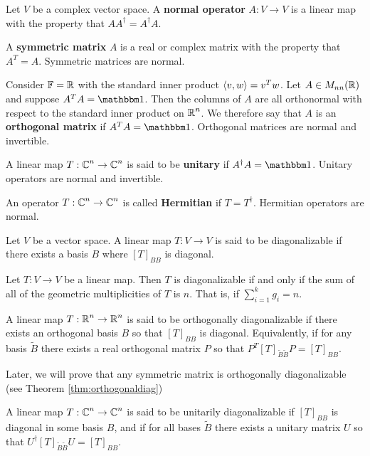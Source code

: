 \begin{defn} Let $V$ be a complex vector space. A \textbf{normal operator} $A: V\to V$ is a linear map with the property that $AA^\dagger = A^\dagger A$.
\end{defn}
\begin{defn} A \textbf{symmetric matrix} $A$ is a real or complex matrix with the property that $A^T = A$. Symmetric matrices are normal.
\end{defn}
\begin{example}
Consider $\operatorname{\mathbb{F}} = \operatorname{\mathbb{R}}$ with the standard inner product $\langle v,w\rangle = v^T w$. 
Let $A\in M_{nn}(\operatorname{\mathbb{R}})$ and suppose $A^T A = \One$. Then the columns of $A$ are all orthonormal with respect to the standard inner product on $\operatorname{\mathbb{R}}^n$. We therefore say that $A$ is an \textbf{orthogonal matrix} if $A^T A = \One$. Orthogonal matrices are normal and invertible. 
\end{example}
\begin{defn}
A linear map $T: \operatorname{\mathbb{C}}^n \to \operatorname{\mathbb{C}}^n$ is said to be \textbf{unitary} if $A^\dagger A = \One$. Unitary operators are normal and invertible.
\end{defn}
\begin{defn}
An operator $T :\operatorname{\mathbb{C}}^n\to \operatorname{\mathbb{C}}^n$ is called \textbf{Hermitian} if $T = T^\dagger$. Hermitian operators are normal.
\end{defn}

\begin{defn}[Diagonalizable] Let $V$ be a vector space. A linear map $T:V\to V$ is said to be diagonalizable if there exists a basis $B$ where $[T]_{BB}$ is diagonal.
\end{defn}
\begin{thm}
    Let $T : V \to V$ be a linear map. Then $T$ is diagonalizable if and only if the sum of all of the geometric multiplicities of $T$ is $n$. That is, if $\sum_{i=1}^k g_i = n$.
\end{thm}
\begin{defn} A linear map $T : \operatorname{\mathbb{R}}^n \to \operatorname{\mathbb{R}}^n$ is said to be orthogonally diagonalizable if there exists an orthogonal basis $B$ so that $[T]_{BB}$ is diagonal. Equivalently, if for any basis $\tilde{B}$ there exists a real orthogonal matrix $P$ so that $P^T [T]_{\tilde{B}\tilde{B}} P = [T]_{BB}$.
\end{defn}
\begin{remark*}
    Later, we will prove that any symmetric matrix is orthogonally diagonalizable (see Theorem \ref{thm:orthogonaldiag})
\end{remark*}
\begin{defn} A linear map $T : \operatorname{\mathbb{C}}^n \to \operatorname{\mathbb{C}}^n$ is said to be unitarily diagonalizable if $[T]_{BB}$ is diagonal in some basis $B$, and if for all bases $\tilde{B}$ there exists a unitary matrix $U$ so that $U^\dagger [T]_{\tilde{B}\tilde{B}}U = [T]_{BB}$.
\end{defn}


